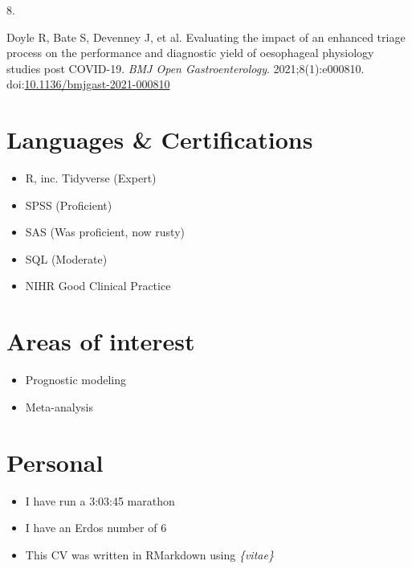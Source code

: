 \documentclass[11pt,a4paper,]{awesome-cv}
\providecommand{\tightlist}{%
	\setlength{\itemsep}{0pt}\setlength{\parskip}{0pt}}
\newlength{\cslhangindent}
\newlength{\csllabelwidth}
\newenvironment{CSLReferences}[2] %
 {\begin{list}{}{%
  \setlength{\itemindent}{0pt}
  \setlength{\leftmargin}{0pt}
  \setlength{\parsep}{0pt}
  \ifodd #1
   \setlength{\leftmargin}{\cslhangindent}
   \setlength{\itemindent}{-1\cslhangindent}
  \fi
  \setlength{\itemsep}{#2\baselineskip}}}
 {\end{list}}
\newcommand{\CSLLeftMargin}[1]{\parbox[t]{\csllabelwidth}{\strut#1\strut}}
\newcommand{\CSLRightInline}[1]{\parbox[t]{\linewidth - \csllabelwidth}{\strut#1\strut}}
\begin{document}
\begin{CSLReferences}{0}{0}
\leavevmode{}%
\CSLLeftMargin{8. }%
\CSLRightInline{Doyle R, Bate S, Devenney J, et al. Evaluating the
impact of an enhanced triage process on the performance and diagnostic
yield of oesophageal physiology studies post COVID-19. \emph{BMJ Open
Gastroenterology}. 2021;8(1):e000810.
doi:\href{https://doi.org/10.1136/bmjgast-2021-000810}{10.1136/bmjgast-2021-000810}}

\end{CSLReferences}

\hypertarget{languages-certifications}{%
\section{Languages \& Certifications}\label{languages-certifications}}

\begin{itemize}
\tightlist
\item
  R, inc. Tidyverse (Expert)
\item
  SPSS (Proficient)
\item
  SAS (Was proficient, now rusty)
\item
  SQL (Moderate)
\item
  NIHR Good Clinical Practice
\end{itemize}

\hypertarget{areas-of-interest}{%
\section{Areas of interest}\label{areas-of-interest}}

\begin{itemize}
\tightlist
\item
  Prognostic modeling
\item
  Meta-analysis
\end{itemize}

\hypertarget{personal}{%
\section{Personal}\label{personal}}

\begin{itemize}
\tightlist
\item
  I have run a 3:03:45 marathon
\item
  I have an Erdos number of 6
\item
  This CV was written in RMarkdown using \emph{\{vitae\}}
\end{itemize}


\label{LastPage}~
\end{document}
